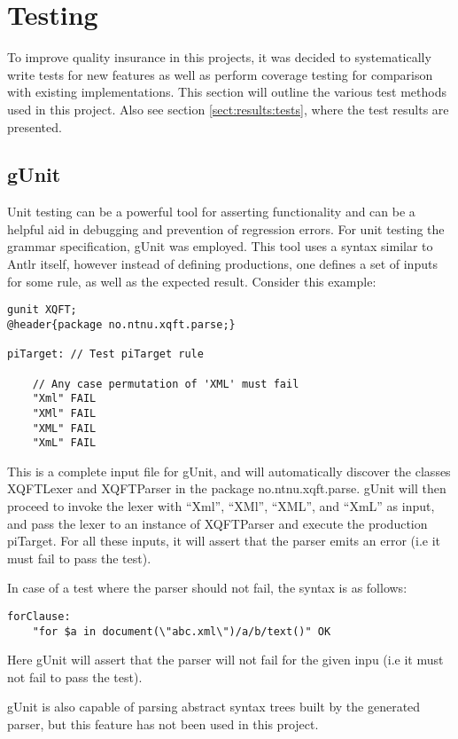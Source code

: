 \section{Testing}
\label{sect:method:testing}
To improve quality insurance in this projects, it was decided to systematically
write tests for new features as well as perform coverage testing for comparison
with existing implementations. This section will outline the various test
methods used in this project. Also see section \ref{sect:results:tests}, where
the test results are presented.

\subsection{gUnit}
\label{sect:method:gUnit}
Unit testing can be a powerful tool for asserting functionality and can be a
helpful aid in debugging and prevention of regression errors.  For unit testing the
grammar specification, gUnit \cite{gunit00} was employed. This tool uses a
syntax similar to Antlr itself, however instead of defining productions, one
defines a set of inputs for some rule, as well as the expected result. Consider
this example:

\begin{Verbatim}
gunit XQFT;
@header{package no.ntnu.xqft.parse;}

piTarget: // Test piTarget rule

    // Any case permutation of 'XML' must fail
    "Xml" FAIL
    "XMl" FAIL
    "XML" FAIL
    "XmL" FAIL
\end{Verbatim}

This is a complete input file for gUnit, and will automatically discover the
classes XQFTLexer and XQFTParser in the package no.ntnu.xqft.parse. gUnit will
then proceed to invoke the lexer with ``Xml'', ``XMl'', ``XML'', and ``XmL'' as
input, and pass the lexer to an instance of XQFTParser and execute the production
piTarget. For all these inputs, it will assert that the parser emits an error
(i.e it must fail to pass the test).

In case of a test where the parser should not fail, the syntax is as follows:
\begin{Verbatim}
forClause:
	"for $a in document(\"abc.xml\")/a/b/text()" OK
\end{Verbatim}
Here gUnit will assert that the parser will not fail for the given inpu (i.e it
must not fail to pass the test).

gUnit is also capable of parsing abstract syntax trees built by the generated
parser, but this feature has not been used in this project.

